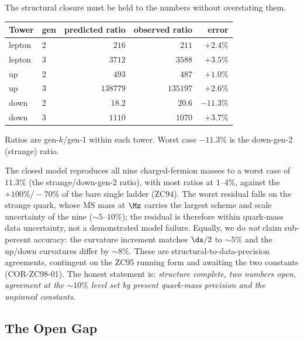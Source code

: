 \documentclass[12pt, a4paper]{article}
\begin{document}
The structural closure must be held to the numbers without overstating them.

\begin{keybox}[title={Nine charged-fermion masses (common scale $\Mz$)}]
{\footnotesize\renewcommand{\arraystretch}{1.25}
\begin{center}
\begin{tabular}{@{}llrrr@{}}
\toprule
Tower & gen & predicted ratio & observed ratio & error \\
\midrule
lepton & 2 & $216$    & $211$    & $+2.4\%$ \\
lepton & 3 & $3712$   & $3588$   & $+3.5\%$ \\
up     & 2 & $493$    & $487$    & $+1.0\%$ \\
up     & 3 & $138779$ & $135197$ & $+2.6\%$ \\
down   & 2 & $18.2$   & $20.6$   & $-11.3\%$ \\
down   & 3 & $1110$   & $1070$   & $+3.7\%$ \\
\bottomrule
\end{tabular}
\end{center}}
\smallskip
\footnotesize Ratios are gen-$k$/gen-1 within each tower. Worst case
$-11.3\%$ is the down-gen-2 (strange) ratio.
\end{keybox}

\begin{formalbox}[title={FIND-ZC98-02: Accuracy and Its Limits}]
The closed model reproduces all nine charged-fermion masses to a worst case of
$11.3\%$ (the strange/down-gen-2 ratio), with most ratios at $1$--$4\%$, against
the $+100\%/-70\%$ of the bare single ladder (ZC94). The worst residual falls on
the strange quark, whose $\overline{\mathrm{MS}}$ mass at $\Mz$ carries the
largest scheme and scale uncertainty of the nine ($\sim5$--$10\%$); the residual
is therefore within quark-mass data uncertainty, not a demonstrated model
failure. Equally, we do \emph{not} claim sub-percent accuracy: the curvature
increment matches $\ds/2$ to $\sim5\%$ and the up/down curvatures differ by
$\sim8\%$. These are structural-to-data-precision agreements, contingent on the
ZC95 running form and awaiting the two constants (COR-ZC98-01). The honest
statement is: \emph{structure complete, two numbers open, agreement at the
$\sim10\%$ level set by present quark-mass precision and the unpinned constants.}
\end{formalbox}

\subsection{The Open Gap}
\label{sec:gap-zc98}
\end{document}
